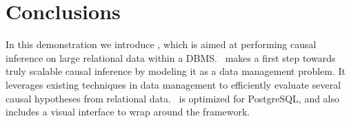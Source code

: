 
\section{Conclusions}
In this demonstration we introduce \GSQL, which is aimed at
performing causal inference
on large relational data within a DBMS. \GSQL\ makes a first step towards truly scalable causal inference by modeling it as a data management problem. It leverages existing techniques
in data management to efficiently evaluate several causal hypotheses
from relational data. \GSQL\ is optimized for PostgreSQL, and also includes a visual interface to wrap around the framework.
